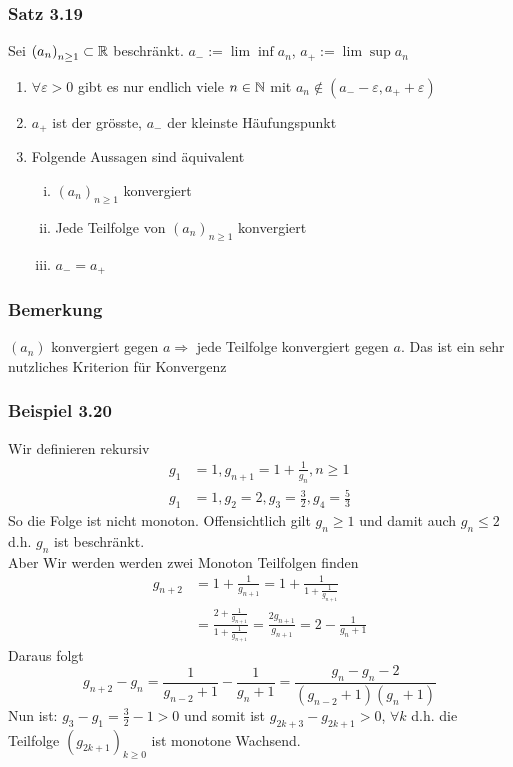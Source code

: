 \subsubsection*{Satz 3.19}
Sei $\left( a_n\right)_{n\geq 1}\subset\mathbb{R}$ beschränkt. $a_{-}:=\lim\inf a_n$, $a_+:=\lim\sup a_n$
\begin{enumerate}
\item $\forall\varepsilon > 0$ gibt es nur endlich viele $n\in\mathbb{N}$ mit $a_n\not\in\left( a_- -\varepsilon,a_+ +\varepsilon\right)$
\item $a_+$ ist der grösste, $a_-$ der kleinste Häufungspunkt
\item Folgende Aussagen sind äquivalent
\begin{enumerate}[(i)]
\item $\left( a_n\right)_{n\geq 1}$ konvergiert
\item Jede Teilfolge von $\left( a_n\right)_{n\geq 1}$ konvergiert
\item $a_-=a_+$ 
\end{enumerate}
\end{enumerate}
\subsubsection*{Bemerkung}
$\left( a_n\right)$ konvergiert gegen $a\Rightarrow$ jede Teilfolge konvergiert gegen $a$. Das ist ein sehr nutzliches Kriterion für Konvergenz

\subsubsection*{Beispiel 3.20}
Wir definieren rekursiv 
\begin{align*}
g_1&=1, g_{n+1}=1+\frac{1}{g_n}, n\geq 1\\
g_1&=1, g_2=2, g_3=\frac{3}{2}, g_4=\frac{5}{3}
\end{align*}
So die Folge ist nicht monoton. Offensichtlich gilt $g_n\geq 1$ und damit auch $g_n\leq 2$ d.h. $g_n$ ist beschränkt.\\

Aber Wir werden werden zwei Monoton Teilfolgen finden
\begin{align*}
{g_{n + 2}}&= 1 + \frac{1}{{{g_{n + 1}}}} = 1 + \frac{1}{{1 + \frac{1}{{{g_{n + 1}}}}}}\\
&= \frac{{2 + \frac{1}{{{g_{n + 1}}}}}}{{1 + \frac{1}{{{g_{n + 1}}}}}} = \frac{{2{g_{n + 1}}}}{{{g_{n + 1}}}} = 2 - \frac{1}{{{g_n} + 1}}
\end{align*}
Daraus folgt 
\[{g_{n + 2}} - {g_n} = \frac{1}{{{g_{n - 2}} + 1}} - \frac{1}{{{g_n} + 1}} = \frac{{{g_n} - {g_n} - 2}}{{\left( {{g_{n - 2}} + 1} \right)\left( {{g_n} + 1} \right)}}\]
Nun ist: $g_3-g_1 = \frac{3}{2}-1>0$ und somit ist $g_{2k+3}-g_{2k+1}>0$, $\forall k$ d.h. die Teilfolge $\left( g_{2k+1}\right)_{k\geq 0}$ ist monotone Wachsend.\\

